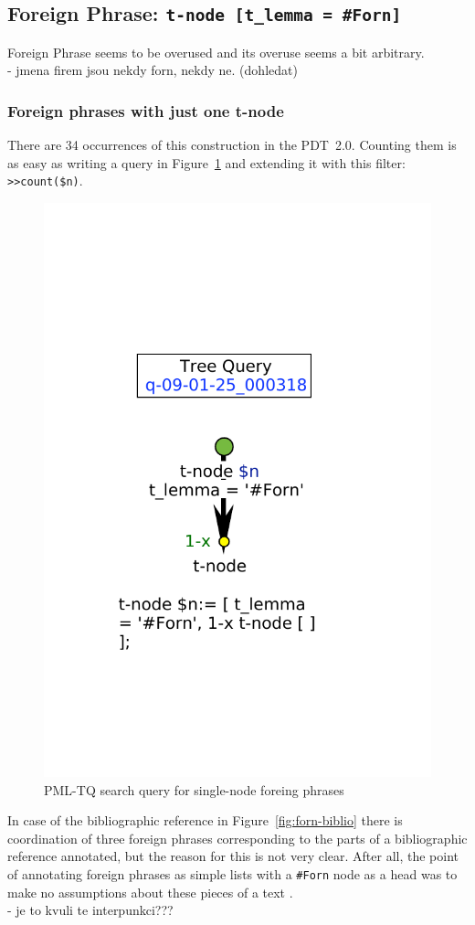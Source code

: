 \documentclass[11pt, a4paper]{article}
\def\code{\texttt}
\begin{document}
\subsection{Foreign Phrase: \code{t-node [t\_lemma = \#Forn]}}\label{PDT:Forn}
Foreign Phrase seems to be overused and its overuse seems a bit arbitrary. \\
- jmena firem jsou nekdy forn, nekdy ne. (dohledat)\\

\subsubsection{Foreign phrases with just one t-node}
There are 34 occurrences of this construction in the PDT~2.0. Counting them is as easy as writing a query in Figure~\ref{fig:tq-forn1} and extending it with this filter: \code{>>count(\$n)}.

\begin{figure}
\includegraphics[width=0.3 \textwidth]{images/vyhledavky/query-forn-1-x.pdf}
\caption{PML-TQ search query for single-node foreing phrases}
\label{fig:tq-forn1}
\end{figure}

In case of the bibliographic reference in Figure~\ref{fig:forn-biblio} there is coordination of three foreign phrases corresponding to the parts of a bibliographic reference annotated, but the reason for this is not very clear. After all, the point of annotating foreign phrases as simple lists with a \code{\#Forn} node as a head was to make no assumptions about these pieces of a text \pageref{pdt-t-man:300}.  \\
- je to kvuli te interpunkci???
\end{document}
